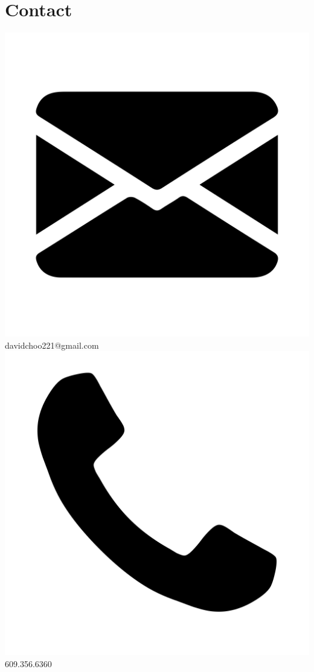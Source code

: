 \documentclass[9pt]{extarticle}
\newcommand\HUGE{\fontsize{24}{29}\selectfont}
\renewcommand{\maketitle}{
    \begin{center}
        {\HUGE\bfseries
        \theauthor}
        \vspace{2.5em}    %
    \end{center}
}
\begin{document}
\author{David Choo}
\maketitle


\begin{minipage}[t]{.25\textwidth}
    \section{Contact}
    \large
    {\includegraphics[scale=0.02]{img/mail}}   davidchoo221@gmail.com
    \vspace{0.5em}\\
    {\includegraphics[scale=0.02]{img/phone}}  609.356.6360

\end{minipage}
\end{document}
